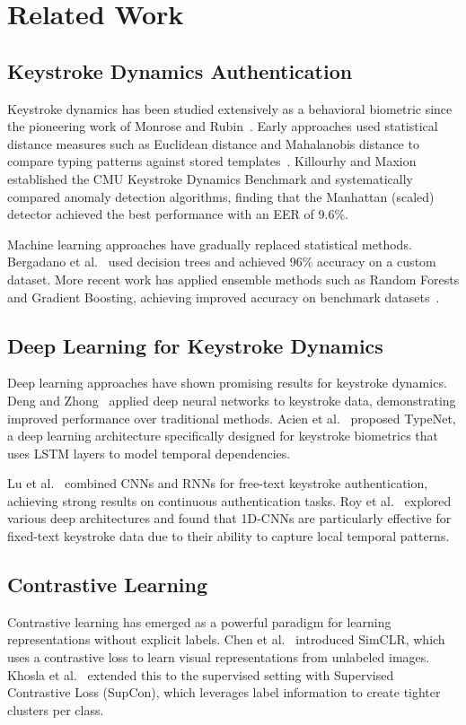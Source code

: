 \documentclass{ieeeaccess}
\begin{document}
{\section{Related Work}
\label{sec:related}

\subsection{Keystroke Dynamics Authentication}
Keystroke dynamics has been studied extensively as a behavioral biometric since the pioneering work of Monrose and Rubin~\cite{b1}. Early approaches used statistical distance measures such as Euclidean distance and Mahalanobis distance to compare typing patterns against stored templates~\cite{b2}. Killourhy and Maxion~\cite{b4} established the CMU Keystroke Dynamics Benchmark and systematically compared anomaly detection algorithms, finding that the Manhattan (scaled) detector achieved the best performance with an EER of 9.6\%.

Machine learning approaches have gradually replaced statistical methods. Bergadano et al.~\cite{b11} used decision trees and achieved 96\% accuracy on a custom dataset. More recent work has applied ensemble methods such as Random Forests and Gradient Boosting, achieving improved accuracy on benchmark datasets~\cite{b5,b12}.

\subsection{Deep Learning for Keystroke Dynamics}
Deep learning approaches have shown promising results for keystroke dynamics. Deng and Zhong~\cite{b7} applied deep neural networks to keystroke data, demonstrating improved performance over traditional methods. Acien et al.~\cite{b13} proposed TypeNet, a deep learning architecture specifically designed for keystroke biometrics that uses LSTM layers to model temporal dependencies.

Lu et al.~\cite{b8} combined CNNs and RNNs for free-text keystroke authentication, achieving strong results on continuous authentication tasks. Roy et al.~\cite{b14} explored various deep architectures and found that 1D-CNNs are particularly effective for fixed-text keystroke data due to their ability to capture local temporal patterns.

\subsection{Contrastive Learning}
Contrastive learning has emerged as a powerful paradigm for learning representations without explicit labels. Chen et al.~\cite{b15} introduced SimCLR, which uses a contrastive loss to learn visual representations from unlabeled images. Khosla et al.~\cite{b10} extended this to the supervised setting with Supervised Contrastive Loss (SupCon), which leverages label information to create tighter clusters per class.

}
\end{document}
